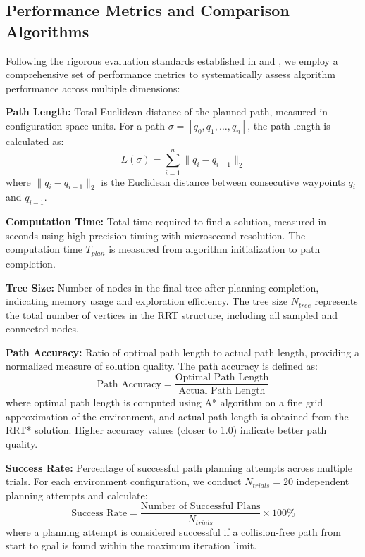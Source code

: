 \documentclass[pdflatex,sn-mathphys-num]{sn-jnl}
\theoremstyle{thmstyleone}%
\theoremstyle{thmstyletwo}%
\theoremstyle{thmstylethree}%
\begin{document}
\subsection{Performance Metrics and Comparison Algorithms}\label{subsec2}

Following the rigorous evaluation standards established in \cite{8} and \cite{14}, we employ a comprehensive set of performance metrics to systematically assess algorithm performance across multiple dimensions:

{
\setlength{\parindent}{0pt}
 \textbf{Path Length:} Total Euclidean distance of the planned path, measured in configuration space units. For a path $\sigma = [q_0, q_1, \ldots, q_n]$, the path length is calculated as:
    \begin{equation}
        L(\sigma) = \sum_{i=1}^{n} \|q_i - q_{i-1}\|_2
        \label{eq:path_length}
    \end{equation}
    where $\|q_i - q_{i-1}\|_2$ is the Euclidean distance between consecutive waypoints $q_i$ and $q_{i-1}$.
    
\textbf{Computation Time:} Total time required to find a solution, measured in seconds using high-precision timing with microsecond resolution. The computation time $T_{plan}$ is measured from algorithm initialization to path completion.
    
\textbf{Tree Size:} Number of nodes in the final tree after planning completion, indicating memory usage and exploration efficiency. The tree size $N_{tree}$ represents the total number of vertices in the RRT structure, including all sampled and connected nodes.
    
\textbf{Path Accuracy:} Ratio of optimal path length to actual path length, providing a normalized measure of solution quality. The path accuracy is defined as:
    \begin{equation}
        \text{Path Accuracy} = \frac{\text{Optimal Path Length}}{\text{Actual Path Length}}
        \label{eq:path_accuracy}
    \end{equation}
    where optimal path length is computed using A* algorithm on a fine grid approximation of the environment, and actual path length is obtained from the RRT* solution. Higher accuracy values (closer to 1.0) indicate better path quality.
    
\textbf{Success Rate:} Percentage of successful path planning attempts across multiple trials. For each environment configuration, we conduct $N_{trials} = 20$ independent planning attempts and calculate:
    \begin{equation}
        \text{Success Rate} = \frac{\text{Number of Successful Plans}}{N_{trials}} \times 100\%
        \label{eq:success_rate}
    \end{equation}
    where a planning attempt is considered successful if a collision-free path from start to goal is found within the maximum iteration limit.
}
\end{document}

